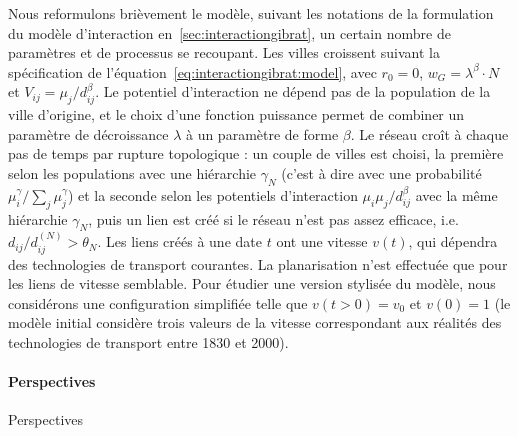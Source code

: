 Nous reformulons brièvement le modèle, suivant les notations de la formulation du modèle d'interaction en~\ref{sec:interactiongibrat}, un certain nombre de paramètres et de processus se recoupant. Les villes croissent suivant la spécification de l'équation~\ref{eq:interactiongibrat:model}, avec $r_0 = 0$, $w_G = \lambda^\beta \cdot N$ et $V_{ij} = \mu_j / d_{ij}^\beta$. Le potentiel d'interaction ne dépend pas de la population de la ville d'origine, et le choix d'une fonction puissance permet de combiner un paramètre de décroissance $\lambda$ à un paramètre de forme $\beta$. Le réseau croît à chaque pas de temps par rupture topologique : un couple de villes est choisi, la première selon les populations avec une hiérarchie $\gamma_N$ (c'est à dire avec une probabilité $\mu_i^\gamma / \sum_j \mu_j^\gamma$) et la seconde selon les potentiels d'interaction $\mu_i \mu_j / d_{ij}^\beta$ avec la même hiérarchie $\gamma_N$, puis un lien est créé si le réseau n'est pas assez efficace, i.e. $d_{ij}/d^{(N)}_{ij}> \theta_N$. Les liens créés à une date $t$ ont une vitesse $v(t)$, qui dépendra des technologies de transport courantes. La planarisation n'est effectuée que pour les liens de vitesse semblable. Pour étudier une version stylisée du modèle, nous considérons une configuration simplifiée telle que $v(t > 0) = v_0$ et $v(0) = 1$ (le modèle initial considère trois valeurs de la vitesse correspondant aux réalités des technologies de transport entre 1830 et 2000).




\paragraph{Perspectives}{Perspectives}

